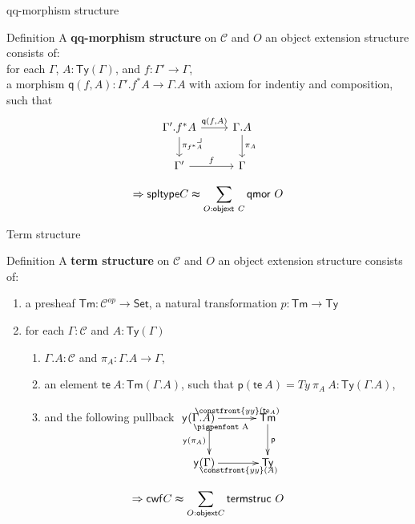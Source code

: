 \documentclass[
  ignorenonframetext,
  aspectratio=169,
  usenames,
  dvipsnames
]{beamer}
\makeatletter
\newcounter{saveenumi}
\newcommand{\saveitem}{\setcounter{saveenumi}{\value{enumi}}}
\newcommand{\pb}{\ar@{}[dr]|<<{\text{\pigpenfont A}}}
\newcommand{\defemph}[1]{\textbf{#1}}
\newcommand{\constfont}[1]{\ensuremath{\mathsf{#1}}}
\newcommand{\CC}{{\mathcal{C}}}
\newcommand{\Ty}{\constfont{Ty}}
\newcommand{\Tm}{\constfont{Tm}}
\newcommand{\set}{\ensuremath{\constfont{Set}}\xspace}
\newcommand{\p}{\constfont{p}}
\newcommand{\Tymap}[1]{\ensuremath{\Ty({#1})}}
\newcommand{\compext}[2]{\ensuremath{{#1}.{#2}}}
\newcommand{\deppr}[1]{\constfont{\pi}_{#1}}
\newcommand{\te}{\ensuremath{\constfont{te}}}
\newcommand{\yofunctor}[1][]{\constfont{y}_{#1}}
\newcommand{\yotranspose}[1]{\constfront{yy}({#1})}
\newcommand{\q}{\constfont{q}}
\newcommand{\qmap}[2]{\ensuremath{\q({#1},{#2})}}
\newcommand{\reindex}[2]{\ensuremath{#1^* #2}}
\newcommand{\qmor}{\constfont{qmor}}
\newcommand{\termstruc}{\constfont{termstruc}}
\newcommand{\objext}{\constfont{objext}}
\newcommand{\stypeC}{\constfont{spltype}}
\newcommand{\cwfC}{\constfont{cwf}}
\makeatother
\begin{document}
\begin{frame}{qq-morphism structure}
  \begin{block}{Definition}
      A \defemph{qq-morphism structure} on $\CC$ and $O$ an object extension structure consists of:  \\
      for each $\Gamma$, $A : \Tymap{\Gamma}$, and $f : \Gamma' \to \Gamma$, \\ a morphism
      $\qmap{f}{A} : \compext{\Gamma'}{\reindex{f}{A}} \to \compext{\Gamma}{A}$ with axiom for indentiy and composition, such that \\
      \[ \begin{tikzcd}[ampersand replacement=\&]
        \compext{\Gamma'}{\reindex{f}{A}}
          \ar[r, "\qmap{f}{A}"]
          \ar[d, "\deppr{\reindex{f}{A}}"]
          \ar[dr, phantom, "\lrcorner", very near start]
        \& \compext{\Gamma}{A} \ar[d, "\deppr{A}"]
        \\
        \Gamma' \ar[r, "f"]
        \& \Gamma
      \end{tikzcd} \]
      \saveitem
    \end{block}  
$$\Rightarrow \stypeC C \thickapprox \sum_{O : \objext\ C} \qmor\ O$$
\end{frame}

\begin{frame}{Term structure}
  \begin{block}{Definition}
      A \defemph{term structure} on $\CC$ and $O$ an object extension structure consists of:  \\
      \begin{enumerate}
        \item a presheaf $\Tm : \CC^{op} \rightarrow \set$, a natural transformation $p : \Tm \rightarrow \Ty$
        \item for each $\Gamma : \CC$ and $A : \Ty(\Gamma)$
        \begin{enumerate}
        \item $\Gamma.A : \CC$ and $\pi_A : \Gamma.A \to \Gamma$,
        \item an element $\te\ A : \Tm(\Gamma.A)$, such that $\p (\te\ A) = Ty\ \pi_A\ A : \Ty(\Gamma.A)$,
        \item and the following pullback
          $
            \begin{xy}
              \xymatrix{
                **[l]\yofunctor(\compext{\Gamma}{A})  \ar[r]^-{\yotranspose{\te_A}} \ar[d]_{\yofunctor(\deppr{A})}  \pb & \Tm \ar[d]^{\p}\\
                **[l]\yofunctor(\Gamma) \ar[r]_{\yotranspose{A}}& \Ty
              }
            \end{xy}
          $
      \end{enumerate}
      \end{enumerate}
    \end{block}  
$$\Rightarrow \cwfC C \thickapprox \sum_{O : \objext C}\termstruc\ O$$
\end{frame}
\end{document}

